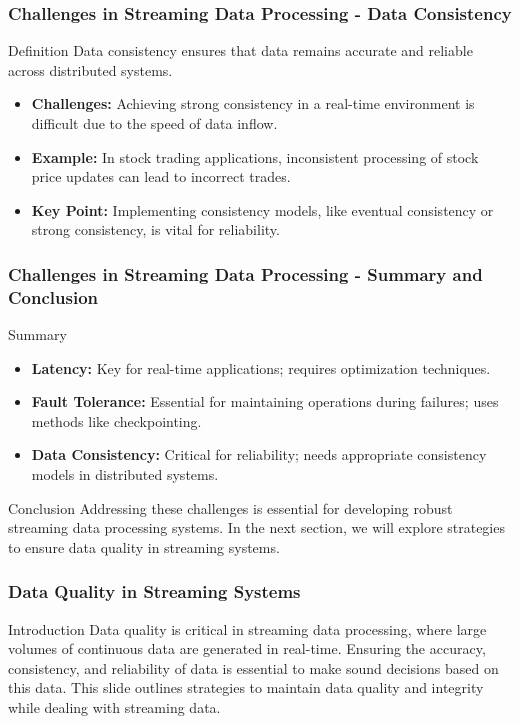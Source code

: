 \documentclass[aspectratio=169]{beamer}
\begin{document}
\begin{frame}[fragile]
    \frametitle{Challenges in Streaming Data Processing - Data Consistency}
    \begin{block}{Definition}
        Data consistency ensures that data remains accurate and reliable across distributed systems.
    \end{block}
    \begin{itemize}
        \item \textbf{Challenges:} Achieving strong consistency in a real-time environment is difficult due to the speed of data inflow.
        \item \textbf{Example:} In stock trading applications, inconsistent processing of stock price updates can lead to incorrect trades.
        \item \textbf{Key Point:} Implementing consistency models, like eventual consistency or strong consistency, is vital for reliability.
    \end{itemize}
\end{frame}

\begin{frame}[fragile]
    \frametitle{Challenges in Streaming Data Processing - Summary and Conclusion}
    \begin{block}{Summary}
        \begin{itemize}
            \item \textbf{Latency:} Key for real-time applications; requires optimization techniques.
            \item \textbf{Fault Tolerance:} Essential for maintaining operations during failures; uses methods like checkpointing.
            \item \textbf{Data Consistency:} Critical for reliability; needs appropriate consistency models in distributed systems.
        \end{itemize}
    \end{block}
    \begin{block}{Conclusion}
        Addressing these challenges is essential for developing robust streaming data processing systems. In the next section, we will explore strategies to ensure data quality in streaming systems.
    \end{block}
\end{frame}

\begin{frame}
    \frametitle{Data Quality in Streaming Systems}
    \begin{block}{Introduction}
        Data quality is critical in streaming data processing, where large volumes of continuous data are generated in real-time. 
        Ensuring the accuracy, consistency, and reliability of data is essential to make sound decisions based on this data. 
        This slide outlines strategies to maintain data quality and integrity while dealing with streaming data.
    \end{block}
\end{frame}
\end{document}
